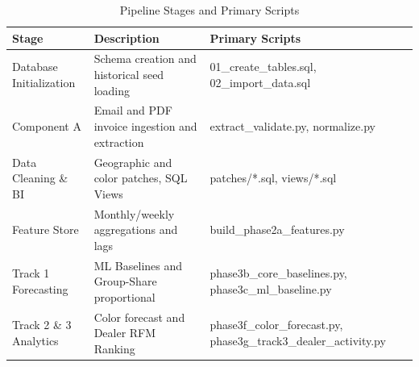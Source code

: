 \begin{table}[htbp]
\centering
\caption{Pipeline Stages and Primary Scripts}
\label{tab:pipeline_stages}
\begin{tabular}{lll}
\toprule
\textbf{Stage} & \textbf{Description} & \textbf{Primary Scripts} \\
\midrule
Database Initialization & Schema creation and historical seed loading & 01\_create\_tables.sql, 02\_import\_data.sql \\
Component A & Email and PDF invoice ingestion and extraction & extract\_validate.py, normalize.py \\
Data Cleaning \& BI & Geographic and color patches, SQL Views & patches/*.sql, views/*.sql \\
Feature Store & Monthly/weekly aggregations and lags & build\_phase2a\_features.py \\
Track 1 Forecasting & ML Baselines and Group-Share proportional & phase3b\_core\_baselines.py, phase3c\_ml\_baseline.py \\
Track 2 \& 3 Analytics & Color forecast and Dealer RFM Ranking & phase3f\_color\_forecast.py, phase3g\_track3\_dealer\_activity.py \\
\bottomrule
\end{tabular}
\end{table}
